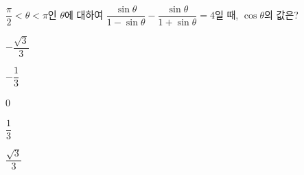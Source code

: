 $\dfrac{\pi}{2}<\theta<\pi$인 $\theta$에 대하여 $\dfrac{\sin\theta}{1-\sin\theta}-\dfrac{\sin\theta}{1+\sin\theta}=4$일 때, $\cos\theta$의 값은?
\begin{choices32}{\rule[-3ex]{0pt}{8ex}$-\dfrac{\sqrt{3}}{3}$}{\rule[-3ex]{0pt}{8ex}$-\dfrac{1}{3}$}{\rule[-3ex]{0pt}{8ex}$0$}{\rule[-3ex]{0pt}{8ex}$\dfrac{1}{3}$}{\rule[-3ex]{0pt}{8ex}$\dfrac{\sqrt{3}}{3}$}\end{choices32}
